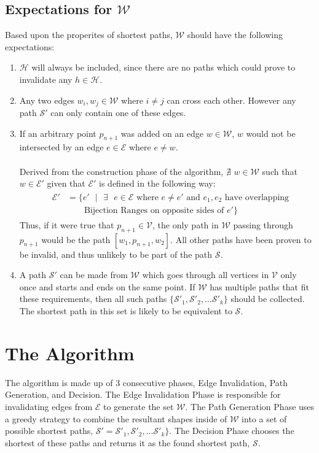 \documentclass[12pt]{article}
\begin{document}
\subsection{Expectations for $\mathcal{W}$}\label{subsec:exp_w}
Based upon the properites of shortest paths, $\mathcal{W}$ should have the following expectations:
\begin{enumerate}
\item $\mathcal{H}$ will always be included, since there are no paths
which could prove to invalidate any $h \in \mathcal{H}$.
\item Any two edges $w_i,w_j \in \mathcal{W}$ where $i \neq j$ can cross each other.
However any path $\mathcal{S}'$ can only contain one of these edges.
\item If an arbitrary point $p_{n+1}$ was added on an edge $w \in \mathcal{W}$,
$w$ would not be intersected by an edge $e \in \mathcal{E}$ where $e \neq w$.
\\\\
Derived from the construction phase of the algorithm,
$\nexists$ $w \in \mathcal{W}$ such that $w \in \mathcal{E}'$
given that $\mathcal{E}'$ is defined in the following way:
\begin{align*}
&\begin{aligned}
\mathcal{E}' &= \{e'\text{ }|\text{ }\exists\text{ }e \in \mathcal{E} \text{ where } e \neq e'
\text{ and } e_1,e_2 \text{ have overlapping}\\
&\qquad \text{Bijection Ranges on opposite sides of } e'\}
\end{aligned}
\end{align*}
Thus, if it were true that $p_{n+1} \in \mathcal{V}$,
the only path in $\mathcal{W}$ passing
through $p_{n + 1}$ would be the path $[w_1,p_{n+1},w_2]$.
All other paths have been proven to be invalid,
and thus unlikely to be part of the path $\mathcal{S}$.
\item A path $\mathcal{S}'$ can be made from $\mathcal{W}$
which goes through all vertices in $\mathcal{V}$ only once
and starts and ends on the same point.
If $\mathcal{W}$ has multiple paths that fit these requirements, then all such paths
$\{\mathcal{S}'_1, \mathcal{S}'_2, ... \mathcal{S}'_k\}$ should be collected.
The shortest path in this set is likely to be equivalent to $\mathcal{S}$.
\end{enumerate}

\section{The Algorithm}
The algorithm is made up of 3 consecutive phases,
Edge Invalidation, Path Generation, and Decision.
The Edge Invalidation Phase is
responsible for invalidating edges from $\mathcal{E}$ to generate the set
$\mathcal{W}$. The Path Generation Phase uses a greedy strategy to combine the resultant
shapes inside of $\mathcal{W}$ into a set of possible shortest paths,
$\mathcal{S}' = \mathcal{S}'_1, \mathcal{S}'_2, ... \mathcal{S}'_k\}$.
The Decision Phase chooses the shortest of these paths and returns it as the
found shortest path, $\mathcal{S}$.
\end{document}
